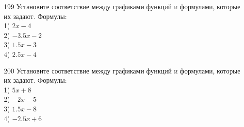 \documentclass[4apaper]{article}
\begin{document}
\begin{taskBN}{199}
Установите соответствие между графиками функций и формулами, которые их задают. Формулы: \\1) $2x-4$\\2) $-3.5x-2$\\3) $1.5x-3$\\4) $2.5x-4$
\end{taskBN}

\begin{taskBN}{200}
Установите соответствие между графиками функций и формулами, которые их задают. Формулы: \\1) $5x+8$\\2) $-2x-5$\\3) $1.5x-8$\\4) $-2.5x+6$
\end{taskBN}
\end{document}
